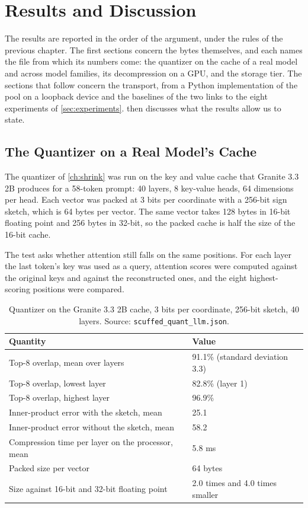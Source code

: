 \chapter{Results and Discussion}
\label{ch:results}

The results are reported in the order of the argument, under the rules of
the previous chapter. The first
sections concern the bytes themselves, and each names the file from which
its numbers come: the quantizer on the cache of a real model and across
model families, its decompression on a GPU, and the storage tier. The
sections that follow concern the transport, from a Python implementation of
the pool on a loopback device and the baselines of the two links to the
eight experiments of \cref{sec:experiments}.  then
discusses what the results allow us to state.

\section{The Quantizer on a Real Model's Cache}
\label{sec:res-quant}

The quantizer of \cref{ch:shrink} was run on the key and value cache that
Granite 3.3 2B \citep{granite33} produces for a 58-token prompt: 40 layers,
8 key-value heads, 64 dimensions per head. Each vector was packed at 3 bits
per coordinate with a 256-bit sign sketch, which is 64 bytes per vector. The
same vector takes 128 bytes in 16-bit floating point and 256 bytes in 32-bit,
so the packed cache is half the size of the 16-bit cache.

The test asks whether attention still falls on the same positions. For each
layer the last token's key was used as a query, attention scores were computed
against the original keys and against the reconstructed ones, and the eight
highest-scoring positions were compared.

\begin{table}[htbp]
  \centering
  \caption[Quantizer on the Granite 3.3 2B cache at 3 bits per coordinate]{Quantizer on the Granite 3.3 2B cache, 3 bits per coordinate, 256-bit sketch, 40 layers. Source: \nolinkurl{scuffed_quant_llm.json}.}
  \label{tab:quant}
  \small
  \begin{tabular}{L{8.6cm}L{4.6cm}}
    \toprule
    Quantity & Value \\
    \midrule
    Top-8 overlap, mean over layers & 91.1\% (standard deviation 3.3) \\
    Top-8 overlap, lowest layer & 82.8\% (layer 1) \\
    Top-8 overlap, highest layer & 96.9\% \\
    Inner-product error with the sketch, mean & 25.1 \\
    Inner-product error without the sketch, mean & 58.2 \\
    Compression time per layer on the processor, mean & 5.8 ms \\
    Packed size per vector & 64 bytes \\
    Size against 16-bit and 32-bit floating point & 2.0 times and 4.0 times smaller \\
    \bottomrule
  \end{tabular}
\end{table}

